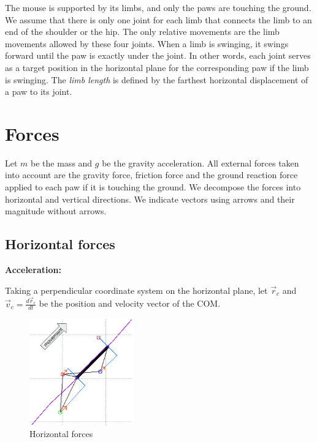 \documentclass[11pt]{article}
\begin{document}
The mouse is supported by its limbs, and only the paws are touching the ground. We assume that there is only one joint for each limb that connects the limb to an end of the shoulder or the hip. The only relative movements are the limb movements allowed by these four joints. When a limb is swinging, it swings forward until the paw is exactly under the joint. In other words, each joint serves as a target position in the horizontal plane for the corresponding paw if the limb is swinging. The \textit{limb length} is defined by the farthest horizontal displacement of a paw to its joint. 





\section{Forces}

Let $ m $ be the mass and $ g $ be the gravity acceleration. All external forces taken into account are the gravity force, friction force and the ground reaction force applied to each paw if it is touching the ground. We decompose the forces into horizontal and vertical directions. We indicate vectors using arrows and their magnitude without arrows.


\subsection{Horizontal forces}

\noindent\textbf{Acceleration:}

Taking a perpendicular coordinate system on the horizontal plane, let $ \vec{r}_c $ and $ \vec{v}_c=\frac{d\vec{r}_c}{dt} $ be the position and velocity vector of the COM.

\begin{figure}[h]
	\centering
	\includegraphics[width=0.4\textwidth]{horizontal_forces.png}
	\caption{Horizontal forces}
	\label{fig:horiforce}
\end{figure}
\end{document}
